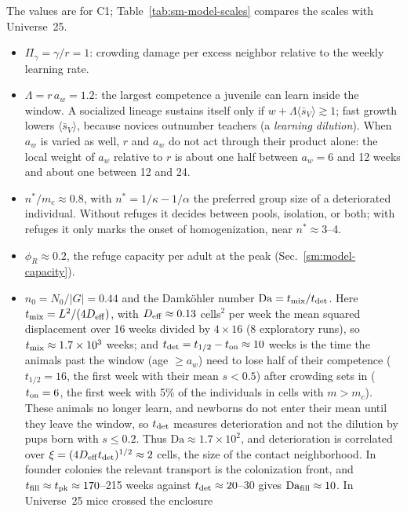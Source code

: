 The values are for \textsf{C1}; Table~\ref{tab:sm-model-scales} compares the scales with Universe~25.
\begin{itemize}
  \item $\Pi_\gamma=\gamma/r=1$: crowding damage per excess neighbor relative to the weekly learning rate.
  \item $\Lambda=r\,a_w=1.2$: the largest competence a juvenile can learn inside the window. A socialized lineage
    sustains itself only if $w+\Lambda\langle\bar s_V\rangle\gtrsim1$; fast growth lowers $\langle\bar s_V\rangle$,
    because novices outnumber teachers (a \emph{learning dilution}). When $a_w$ is varied as well, $r$ and $a_w$ do not
    act through their product alone: the local weight of $a_w$ relative to $r$ is about one half between $a_w=6$ and
    12 weeks and about one between 12 and 24.
  \item $n^*/m_c\approx0.8$, with $n^*=1/\kappa-1/\alpha$ the preferred group size of a deteriorated individual.
    Without refuges it decides between pools, isolation, or both; with refuges it only marks the onset of
    homogenization, near $n^*\approx3$--4.
  \item $\phi_R\approx0.2$, the refuge capacity per adult at the peak (Sec.~\ref{sm:model-capacity}).
  \item $n_0=N_0/|G|=0.44$ and the Damk\"ohler number $\mathrm{Da}=t_{\rm mix}/t_{\rm det}$. Here
    $t_{\rm mix}=L^2/(4D_{\rm eff})$, with $D_{\rm eff}\approx0.13$ cells$^2$ per week the mean squared displacement
    over 16 weeks divided by $4\times16$ (8 exploratory runs), so $t_{\rm mix}\approx1.7\times10^3$ weeks; and
    $t_{\rm det}=t_{1/2}-t_{\rm on}\approx10$ weeks is the time the animals past the window (age $\ge a_w$) need to
    lose half of their competence ($t_{1/2}=16$, the first week with their mean $s<0.5$) after crowding sets in
    ($t_{\rm on}=6$, the first week with 5\% of the individuals in cells with $m>m_c$). These animals no longer learn,
    and newborns do not enter their mean until they leave the window, so $t_{\rm det}$ measures deterioration and not
    the dilution by pups born with $s\le0.2$. Thus $\mathrm{Da}\approx1.7\times10^2$, and deterioration is correlated
    over $\xi=(4D_{\rm eff}t_{\rm det})^{1/2}\approx2$ cells, the size of the contact neighborhood. In founder colonies
    the relevant transport is the colonization front, and $t_{\rm fill}\approx t_{\rm pk}\approx170$--215 weeks against
    $t_{\rm det}\approx20$--30 gives $\mathrm{Da}_{\rm fill}\approx10$. In Universe~25 mice crossed the enclosure

\end{itemize}
